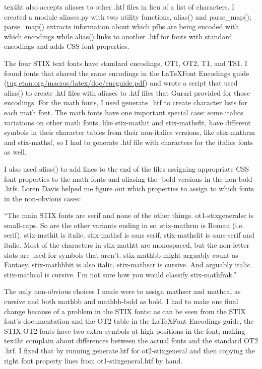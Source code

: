 \documentclass[12pt]{article}
\begin{document}

tex4ht also accepts aliases to other .htf files in lieu of a list of
characters.  I created a module aliases.py with two utility functions,
alias() and parse\_map(); parse\_map() extracts information about which pfbs
are being encoded with which encodings while alias() links to another
.htf for fonts with standard encodings and adds CSS font properties.  

The four STIX text fonts have standard encodings, OT1, OT2, T1, and
TS1.  I found fonts that shared the same encodings in the \LaTeX Font
Encodings guide (\url{tug.ctan.org/macros/latex/doc/encguide.pdf}) and
wrote a script that used alias() to create .htf files with aliases to
.htf files that Gurari provided for those encodings.  For the math
fonts, I used generate\_htf to create character lists for each math
font.  The math fonts have one important special case: some italics
variations on other math fonts, like stix-mathit and stix-mathsfit,
have different symbols in their character tables from their
non-italics versions, like stix-mathrm and stix-mathsf, so I had to
generate .htf file with characters for the italics fonts as well.

I also used alias() to add lines to the end of the files assigning
appropriate CSS font properties to the math fonts and aliasing the
-bold versions in the non-bold .htfs.  Loren Davis helped me figure
out which properties to assign to which fonts in the non-obvious
cases:

``The main STIX fonts are serif and none of the other things.
ot1-stixgeneralsc is small-caps.
So are the other variants ending in sc.
stix-mathrm is Roman (i.e. serif).
stix-mathit is italic.
stix-mathsf is sans serif.
stix-mathsfit is sans-serif and italic.
Most of the characters in stix-mathtt are monospaced, but the non-letter slots are used for symbols that aren't.
stix-mathbb might arguably count as Fantasy.
stix-mathbbit is also italic.
stix-mathscr is cursive.
And arguably italic.
stix-mathcal is cursive.
I'm not sure how you would classify stix-mathfrak.''

The only non-obvious choices I made were to assign mathscr and mathcal
as cursive and both mathbb and mathbb-bold as bold.  I had to make one
final change because of a problem in the STIX fonts: as can be seen
from the STIX font's documentation and the OT2 table in the \LaTeX Font
Encodings guide, the STIX OT2 fonts have two extra symbols at high
positions in the font, making tex4ht complain about differences
between the actual fonts and the standard OT2 .htf.  I fixed that by
running generate.htf for ot2-stixgeneral and then copying the right
font property lines from ot1-stixgeneral.htf by hand.
\end{document}
